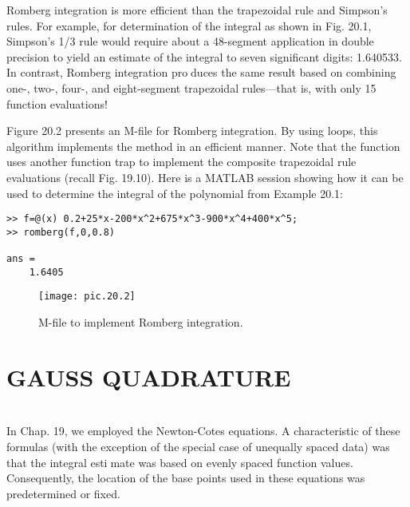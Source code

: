 Romberg integration is more efficient than the trapezoidal rule and Simpson’s rules.
For example, for determination of the integral as shown in Fig. 20.1, Simpson’s 1/3 rule
would require about a 48-segment application in double precision to yield an estimate of
the integral to seven significant digits: 1.640533. In contrast, Romberg integration produces the same result based on combining one-, two-, four-, and eight-segment trapezoidal
rules—that is, with only 15 function evaluations!

Figure 20.2 presents an M-file for Romberg integration. By using loops, this algorithm
implements the method in an efficient manner. Note that the function uses another function
trap to implement the composite trapezoidal rule evaluations (recall Fig. 19.10). Here is
a MATLAB session showing how it can be used to determine the integral of the polynomial
from Example 20.1:

\begin{verbatim}
>> f=@(x) 0.2+25*x-200*x^2+675*x^3-900*x^4+400*x^5;
>> romberg(f,0,0.8)

ans =
    1.6405
\end{verbatim}

\begin{figure}[hbt!]
	\centering
	\texttt{[image: pic.20.2]}
	\caption{\textsf{M-file to implement Romberg integration.}} \hline
	\label{pic.20.2}
\end{figure}

\vspace{0,3in}
\chapter{GAUSS QUADRATURE}
\vspace{0,1in}
\hline\\
\vspace{0,1in}
In Chap. 19, we employed the Newton-Cotes equations. A characteristic of these formulas
(with the exception of the special case of unequally spaced data) was that the integral estimate was based on evenly spaced function values. Consequently, the location of the base
points used in these equations was predetermined or fixed.

